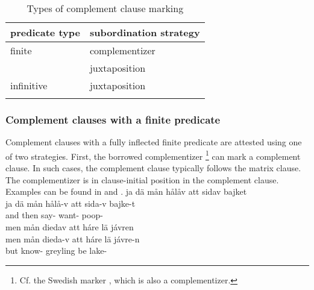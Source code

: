 \begin{table}[h]\centering
\caption{Types of complement clause marking}\label{complementClauseSummary}
\begin{tabular}{ll}\mytoprule
{predicate type}	&{subordination strategy}	\\\hline%
{finite}	& complementizer \It{att}	\\%
				& juxtaposition	\\%
infinitive			& juxtaposition	\\\mybottomrule
\end{tabular}
\end{table}


\subsubsection{Complement clauses with a finite predicate}\label{finiteComplementClauses}
Complement clauses with a fully inflected finite predicate are attested using one of two strategies. 
First, the borrowed complementizer \footnote{Cf. the Swedish marker , which is also a complementizer.} 
can mark a complement clause. In such cases, the complement clause typically follows the matrix clause. The complementizer is in clause-initial position in the complement clause. 
Examples can be found in  and .
\ea\label{complementizer1}
\glll	ja dä mån hålåv att sidav bajket\\
	ja dä mån hålå-v att sida-v bajke-t\\
	and then  say-  want- poop-\\\nopagebreak
{} 
\z
\ea\label{complementizer2}
\glll	men mån diedav att háre lä jávren\\
	men mån dieda-v att háre lä jávre-n\\
	but  know-  greyling\BS{} be\BS{} lake-\\\nopagebreak
{} 
\z

